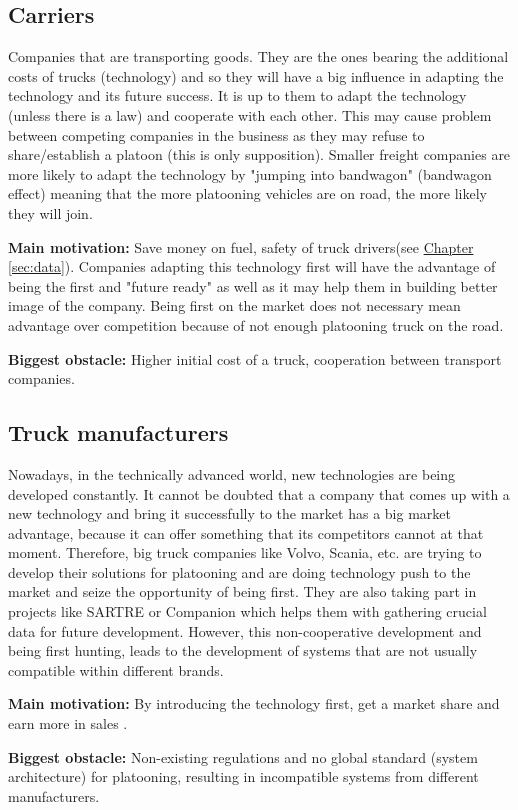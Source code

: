 \subsection{Carriers}
Companies that are transporting goods. They are the ones bearing the additional costs of trucks (technology) and so they will have a big influence in adapting the technology and its future success. It is up to them to adapt the technology (unless there is a law) and cooperate with each other. This may cause problem between competing companies in the business as they may refuse to share/establish a platoon (this is only supposition). Smaller freight companies are more likely to adapt the technology by "jumping into bandwagon" (bandwagon effect) meaning that the more platooning vehicles are on road, the more likely they will join.
% 
\par \textbf{Main motivation:} Save money on fuel, safety of truck drivers(see \hyperref[sec:data]{Chapter} \ref{sec:data}). Companies adapting this technology first will have the advantage of being the first and "future ready" as well as it may help them in building better image of the company. Being first on the market does not necessary mean advantage over competition because of not enough platooning truck on the road.
% 
\par \textbf{Biggest obstacle:} Higher initial cost of a truck, cooperation between transport companies.
% 
\subsection{Truck manufacturers}
Nowadays, in the technically advanced world, new technologies are being developed constantly. It cannot be doubted that a company that comes up with a new technology and bring it successfully to the market has a big market advantage, because it can offer something that its competitors cannot at that moment. Therefore, big truck companies like Volvo, Scania, etc. are trying to develop their solutions for platooning and are doing technology push to the market and seize the opportunity of being first. They are also taking part in projects like SARTRE \cite{Chan2012ProjectSARTRE} or Companion \cite{2016CompanionProject} which helps them with gathering crucial data for future development. However, this non-cooperative development and being first hunting, leads to the development of systems that are not usually compatible within different brands.\par
% 
\par \textbf{Main motivation:} By introducing the technology first, get a market share and earn more in sales \cite{Banbury1995TheSurvival}.\par
% 
\par \textbf{Biggest obstacle:} Non-existing regulations and no global standard (system architecture) for platooning, resulting in incompatible systems from different manufacturers.\par
% 
